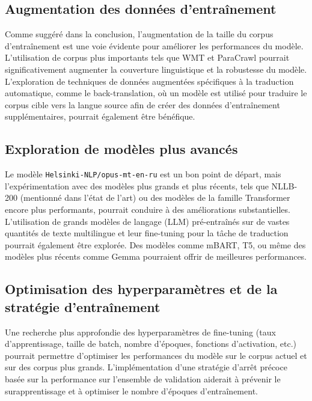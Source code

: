 \documentclass[11pt,a4paper]{article}
\begin{document}
\subsection{Augmentation des données d'entraînement}
Comme suggéré dans la conclusion, l'augmentation de la taille du corpus d'entraînement est une voie évidente pour améliorer les performances du modèle. L'utilisation de corpus plus importants tels que WMT\citep{Bojar2016Findings} et ParaCrawl\citep{Barrault2020Paracrawl} pourrait significativement augmenter la couverture linguistique et la robustesse du modèle. L'exploration de techniques de données augmentées spécifiques à la traduction automatique, comme le back-translation\citep{Sennrich2016Improving}, où un modèle est utilisé pour traduire le corpus cible vers la langue source afin de créer des données d'entraînement supplémentaires, pourrait également être bénéfique.

\subsection{Exploration de modèles plus avancés}
Le modèle \texttt{Helsinki-NLP/opus-mt-en-ru} est un bon point de départ, mais l'expérimentation avec des modèles plus grands et plus récents, tels que NLLB-200\citep{NLLB2025No} (mentionné dans l'état de l'art) ou des modèles de la famille Transformer encore plus performants, pourrait conduire à des améliorations substantielles. L'utilisation de grands modèles de langage (LLM) pré-entraînés sur de vastes quantités de texte multilingue et leur fine-tuning pour la tâche de traduction pourrait également être explorée. Des modèles comme mBART\citep{Liu2020Multilingual}, T5\citep{Raffel2021Exploring}, ou même des modèles plus récents comme Gemma\citep{Team1996Gemma} pourraient offrir de meilleures performances.

\subsection{Optimisation des hyperparamètres et de la stratégie d'entraînement}
Une recherche plus approfondie des hyperparamètres de fine-tuning (taux d'apprentissage, taille de batch, nombre d'époques, fonctions d'activation, etc.) pourrait permettre d'optimiser les performances du modèle sur le corpus actuel et sur des corpus plus grands. L'implémentation d'une stratégie d'arrêt précoce basée sur la performance sur l'ensemble de validation aiderait à prévenir le surapprentissage et à optimiser le nombre d'époques d'entraînement.
\end{document}

